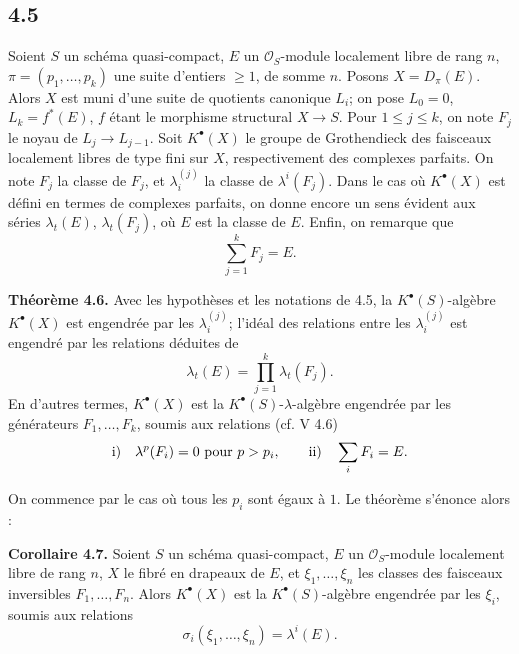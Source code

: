 \documentclass[11pt]{article}
\begin{document}
\subsection*{4.5}
Soient \(S\) un schéma quasi-compact, \(E\) un \(\mathcal O_S\)-module localement libre de rang \(n\), \(\pi=(p_1,\ldots,p_k)\) une suite d'entiers \(\geq1\), de somme \(n\). Posons \(X=D_\pi(E)\). Alors \(X\) est muni d'une suite de quotients canonique \(L_i\); on pose \(L_0=0\), \(L_k=f^*(E)\), \(f\) étant le morphisme structural \(X\to S\). Pour \(1\leq j\leq k\), on note \(F_j\) le noyau de \(L_j\to L_{j-1}\). Soit \(K^\bullet(X)\) le groupe de Grothendieck des faisceaux localement libres de type fini sur \(X\), respectivement des complexes parfaits. On note \(F_j\) la classe de \(F_j\), et \(\lambda_i^{(j)}\) la classe de \(\lambda^i(F_j)\). Dans le cas où \(K^\bullet(X)\) est défini en termes de complexes parfaits, on donne encore un sens évident aux séries \(\lambda_t(E)\), \(\lambda_t(F_j)\), où \(E\) est la classe de \(E\). Enfin, on remarque que
\[
  \sum_{j=1}^{k}F_j=E.
\]

\textbf{Théorème 4.6.} Avec les hypothèses et les notations de 4.5, la \(K^\bullet(S)\)-algèbre \(K^\bullet(X)\) est engendrée par les \(\lambda_i^{(j)}\); l'idéal des relations entre les \(\lambda_i^{(j)}\) est engendré par les relations déduites de
\[
  \lambda_t(E)=\prod_{j=1}^{k}\lambda_t(F_j).
\]
En d'autres termes, \(K^\bullet(X)\) est la \(K^\bullet(S)\)-\(\lambda\)-algèbre engendrée par les générateurs \(F_1,\ldots,F_k\), soumis aux relations (cf. V 4.6)
\[
  \text{\rm i)}\quad \lambda^p(F_i)=0 \text{ pour }p>p_i,
  \qquad
  \text{\rm ii)}\quad \sum_iF_i=E.
\]

On commence par le cas où tous les \(p_i\) sont égaux à \(1\). Le théorème s'énonce alors :

\textbf{Corollaire 4.7.} Soient \(S\) un schéma quasi-compact, \(E\) un \(\mathcal O_S\)-module localement libre de rang \(n\), \(X\) le fibré en drapeaux de \(E\), et \(\xi_1,\ldots,\xi_n\) les classes des faisceaux inversibles \(F_1,\ldots,F_n\). Alors \(K^\bullet(X)\) est la \(K^\bullet(S)\)-algèbre engendrée par les \(\xi_i\), soumis aux relations
\[
  \sigma_i(\xi_1,\ldots,\xi_n)=\lambda^i(E).
\]
\end{document}
